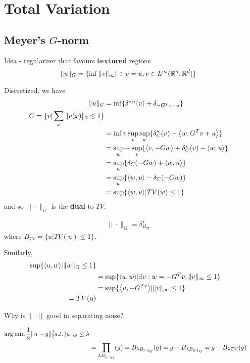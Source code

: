\chapter{Total Variation}
\label{cha:total-variation}

\section{Meyer's $G$-norm}
\label{sec:meyers-g-norm}

Idea - regularizer that favours \textbf{textured} regions
\begin{align}
  \| u \|_{G} = \{ \inf \| v \|_{\infty} | \div v = u, v \in
  L^{\infty}(\mathbb{R}^{d}, \mathbb{R}^{d}) \}
\end{align} 

Discretized, we have
\begin{align}
  \| u \|_{G} &= \inf \{ \delta^{\star_{C}}(v) + \delta_{-G^{T} v = u}
  \} \\
  C = \{ v | \sum_{x} \| v(x) \|_{2} \leq 1 \} \\
  &= \inf v \sup_{v} \sup_{w} \{ \delta^{\star}_{C}(v) - \IP{w, G^{T}
    v + u} \} \\
  &= \sup_{w} -\sup_{v} \{ \IP{v, -Gw} + \delta^{\star}_{C}(v) -
  \IP{w, u} \} \\
  &= \sup_{w} \{ \delta_{C}(-Gw) + \IP{w, u} \} \\
  &= \sup_{w} \{ \IP{w, u} - \delta_{C}(-Gw) \} \\
  &= \sup \{ \IP{w, u} | TV(w) \leq 1 \}
\end{align} and so $\| \cdot \|_{G}$ is the \textbf{dual} to $TV$.

\begin{align}
  \| \cdot \|_{G} = \delta^{\star}_{B_{TV}}
\end{align} where $B_{TV} = \{ u | TV(u) \leq 1 \}$.

Similarly,
\begin{align}
  \sup \{ \IP{u, w} | \| w \|_{G} \leq 1 \} \\
  &= \sup \{ \IP{u, w} | \exists v: w = -G^{T}v, \| v \|_{\infty} \leq
  1 \} \\
  &= \sup \{ \IP{u, -G^{T v}} | \| v \|_{\infty} \leq 1 \} \\
  = TV(u)
\end{align}

Why is $\| \cdot \|$ good in separating noise?

\begin{align}
  \label{eq:104}
  \operatorname*{arg\,min} \frac{1}{2} \| u - g \|_{2}^{2} s.t. \| u \|_{G} \leq
  \lambda \\
  &= \prod_{\lambda B_{\| \cdot \|_{G}}}(g) = B_{\lambda B_{\| \cdot
      \|_{G}}}(g) = g - B_{\lambda B_{\| \cdot \|_{G}}} = g -
  B_{\lambda TV}(g)
\end{align}

